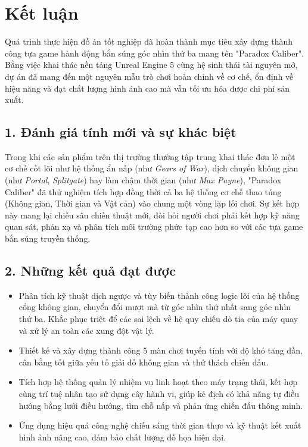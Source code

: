 \documentclass[../DoAn.tex]{subfiles}
\begin{document}
\section{Kết luận}

Quá trình thực hiện đồ án tốt nghiệp đã hoàn thành mục tiêu xây dựng thành công tựa game hành động bắn súng góc nhìn thứ ba mang tên "Paradox Caliber". Bằng việc khai thác nền tảng Unreal Engine 5 cùng hệ sinh thái tài nguyên mở, dự án đã mang đến một nguyên mẫu trò chơi hoàn chỉnh về cơ chế, ổn định về hiệu năng và đạt chất lượng hình ảnh cao mà vẫn tối ưu hóa được chi phí sản xuất.

\subsection*{1. Đánh giá tính mới và sự khác biệt}
Trong khi các sản phẩm trên thị trường thường tập trung khai thác đơn lẻ một cơ chế cốt lõi như hệ thống ẩn nấp (như \textit{Gears of War}), dịch chuyển không gian (như \textit{Portal}, \textit{Splitgate}) hay làm chậm thời gian (như \textit{Max Payne}), "Paradox Caliber" đã thử nghiệm tích hợp đồng thời cả ba hệ thống cơ chế thao túng (Không gian, Thời gian và Vật cản) vào chung một vòng lặp lối chơi. Sự kết hợp này mang lại chiều sâu chiến thuật mới, đòi hỏi người chơi phải kết hợp kỹ năng quan sát, phản xạ và phân tích môi trường phức tạp cao hơn so với các tựa game bắn súng truyền thống.

\subsection*{2. Những kết quả đạt được}
\begin{itemize}
    \item Phân tích kỹ thuật dịch ngược và tùy biến thành công logic lõi của hệ thống cổng không gian, chuyển đổi mượt mà từ góc nhìn thứ nhất sang góc nhìn thứ ba. Khắc phục triệt để các sai lệch về hệ quy chiếu dò tia của máy quay và xử lý an toàn các xung đột vật lý.
    \item Thiết kế và xây dựng thành công 5 màn chơi tuyến tính với độ khó tăng dần, cân bằng tốt giữa yếu tố giải đố không gian và thử thách chiến đấu.
    \item Tích hợp hệ thống quản lý nhiệm vụ linh hoạt theo máy trạng thái, kết hợp cùng trí tuệ nhân tạo sử dụng cây hành vi, giúp kẻ địch có khả năng tự điều hướng bằng lưới điều hướng, tìm chỗ nấp và phản ứng chiến đấu thông minh.
    \item Ứng dụng hiệu quả công nghệ chiếu sáng thời gian thực và kỹ thuật kết xuất hình ảnh nâng cao, đảm bảo chất lượng đồ họa hiện đại.
\end{itemize}
\end{document}
